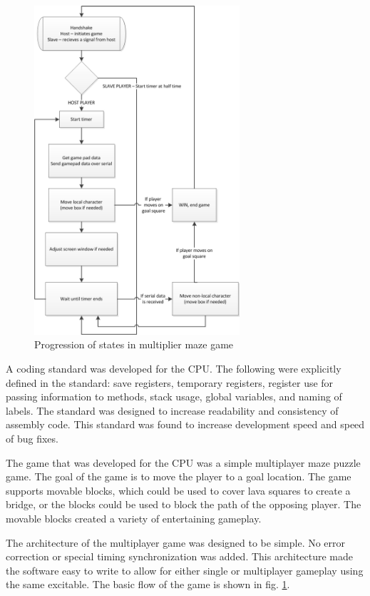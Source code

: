 \documentclass{article}
\begin{document}
\begin{figure}[h!]
	\centering
	\includegraphics[width = 3in]{game.png}
	\caption{Progression of states in multiplier maze game}
	\label{fig:assembler}
\end{figure}

A coding standard was developed for the CPU.  The following were explicitly defined in the standard: save registers, temporary registers, register use for passing information to methods, stack usage, global variables, and naming of labels.  The standard was designed to increase readability and consistency of assembly code.  This standard was found to increase development speed and speed of bug fixes.

The game that was developed for the CPU was a simple multiplayer maze puzzle game.  The goal of the game is to move the player to a goal location.  The game supports movable blocks, which could be used to cover lava squares to create a bridge, or the blocks could be used to block the path of the opposing player.  The movable blocks created a variety of entertaining gameplay.

The architecture of the multiplayer game was designed to be simple.  No error correction or special timing synchronization was added.  This architecture made the software easy to write to allow for either single or multiplayer gameplay using the same excitable.  The basic flow of the game is shown in fig. \ref{fig:assembler}.
\end{document}
